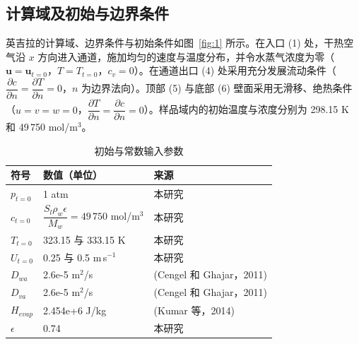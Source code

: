 \documentclass[11pt,a4paper]{ctexart}
\begin{document}
\subsection{计算域及初始与边界条件}

英吉拉的计算域、边界条件与初始条件如图~\ref{fig:1} 所示。在入口 (1) 处，干热空气沿 $x$ 方向进入通道，施加均匀的速度与温度分布，并令水蒸气浓度为零（$\bm{u}=\bm{u}_{t=0}$，$T=T_{t=0}$，$c_v=0$）。在通道出口 (4) 处采用充分发展流动条件（$\dfrac{\partial c}{\partial n}=\dfrac{\partial T}{\partial n}=0$，$n$ 为边界法向）。顶部 (5) 与底部 (6) 壁面采用无滑移、绝热条件（$u=v=w=0$，$\dfrac{\partial T}{\partial n}=\dfrac{\partial c}{\partial n}=0$）。样品域内的初始温度与浓度分别为 298.15 K 和 49\,750 mol/m$^3$。

\begin{table}[H]
\centering
\caption{初始与常数输入参数}
\label{tab:1}
\begin{tabular}{lll}
\toprule
符号 & 数值（单位） & 来源 \\
\midrule
$p_{t=0}$ & 1 atm & 本研究 \\
$c_{t=0}$ & $\dfrac{S_l\rho_w\epsilon}{M_w}=49\,750$ mol/m$^3$ & 本研究 \\
$T_{t=0}$ & 323.15 与 333.15 K & 本研究 \\
$U_{t=0}$ & 0.25 与 0.5 m\,s$^{-1}$ & 本研究 \\
$D_{wa}$ & 2.6e-5 m$^2$/s & (Cengel 和 Ghajar，2011) \\
$D_{va}$ & 2.6e-5 m$^2$/s & (Cengel 和 Ghajar，2011) \\
$H_{evap}$ & 2.454e+6 J/kg & (Kumar 等，2014) \\
$\epsilon$ & 0.74 & 本研究 \\
\bottomrule
\end{tabular}
\end{table}
\end{document}
